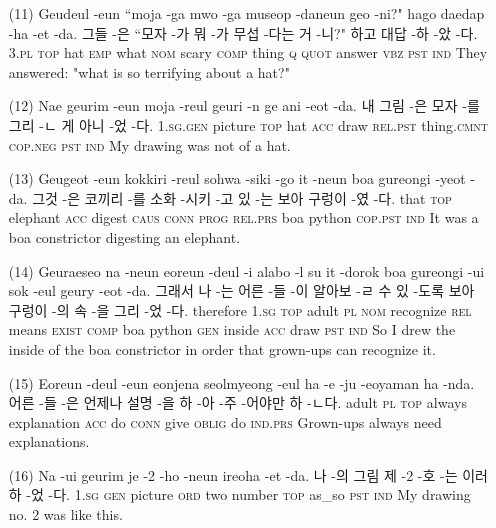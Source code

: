 \begin{itemize}
\item [(11)]
\tgl
		{Geudeul -eun ``moja -ga mwo -ga museop -daneun geo -ni?" hago daedap -ha -et -da.}
		{그들 -은 ``모자 -가 뭐 -가 무섭 -다는 거 -니?" 하고 대답 -하 -았 -다.}
		{\textsc{3.pl} \textsc{top} hat \textsc{emp} what \textsc{nom} scary \textsc{comp} thing \textsc{q} \textsc{quot} answer \textsc{vbz} \textsc{pst} \textsc{ind}}
		{They answered: "what is so terrifying about a hat?"}

\item [(12)]
\tgl
		{Nae geurim -eun moja -reul geuri -n ge ani -eot -da.}
		{내 그림 -은 모자 -를 그리 -ㄴ 게 아니 -었 -다.}
		{\textsc{1.sg.gen} picture \textsc{top} hat \textsc{acc} draw \textsc{rel.pst} thing.\textsc{cmnt} \textsc{cop.neg} \textsc{pst} \textsc{ind}}
		{My drawing was not of a hat.}

\item [(13)]
\tgl
		{Geugeot -eun kokkiri -reul sohwa -siki -go it -neun boa gureongi -yeot -da.}
		{그것 -은 코끼리 -를 소화 -시키 -고 있 -는 보아 구렁이 -였 -다.}
		{that \textsc{top} elephant \textsc{acc} digest \textsc{caus} \textsc{conn} \textsc{prog} \textsc{rel.prs} boa python \textsc{cop.pst} \textsc{ind}}
		{It was a boa constrictor digesting an elephant.}

\item [(14)]
\tgl
		{Geuraeseo na -neun eoreun -deul -i alabo -l su it -dorok boa gureongi -ui sok -eul geury -eot -da.}
		{그래서 나 -는 어른 -들 -이 알아보 -ㄹ 수 있 -도록 보아 구렁이 -의 속 -을 그리 -었 -다.}
		{therefore \textsc{1.sg} \textsc{top} adult \textsc{pl} \textsc{nom} recognize \textsc{rel} means \textsc{exist} \textsc{comp} boa python \textsc{gen} inside \textsc{acc} draw \textsc{pst} \textsc{ind}}
		{So I drew the inside of the boa constrictor in order that grown-ups can recognize it.}

\item [(15)]
\tgl
		{Eoreun -deul -eun eonjena seolmyeong -eul ha -e -ju -eoyaman ha -nda.}
		{어른 -들 -은 언제나 설명 -을 하 -아 -주 -어야만 하 -ㄴ다.}
		{adult \textsc{pl} \textsc{top} always explanation \textsc{acc} do \textsc{conn} give \textsc{oblig} do \textsc{ind.prs}}
		{Grown-ups always need explanations.}

\item [(16)]
\tgl
		{Na -ui geurim je -2 -ho -neun ireoha -et -da.}
		{나 -의 그림 제 -2 -호 -는 이러하 -었 -다.}
		{\textsc{1.sg} \textsc{gen} picture \textsc{ord} two number \textsc{top} as\_so \textsc{pst} \textsc{ind}}
		{My drawing no. 2 was like this.}


\end{itemize}
